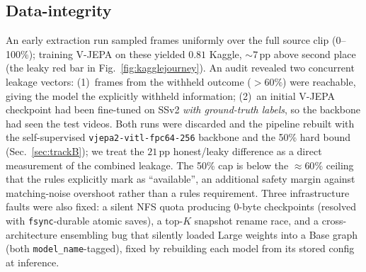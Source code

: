 \documentclass[10pt,twocolumn,letterpaper]{article}
\begin{document}
\subsection{Data-integrity}
\label{sec:integrity}
An early extraction run sampled frames uniformly over the full source clip
(0--100\%); training V-JEPA on these yielded $0.81$ Kaggle, ${\sim}7$\,pp above
second place (the leaky red bar in Fig.~\ref{fig:kagglejourney}). An audit
revealed two concurrent leakage vectors: (1)~frames from the withheld outcome
($>60\%$) were reachable, giving the model the explicitly withheld information;
(2)~an initial V-JEPA checkpoint had been fine-tuned on SSv2 \emph{with
ground-truth labels}, so the backbone had seen the test videos. Both runs were
discarded and the pipeline rebuilt with the self-supervised
\texttt{vjepa2-vitl-fpc64-256} backbone and the 50\% hard bound
(Sec.~\ref{sec:trackB}); we treat the $21$\,pp honest/leaky difference as a
direct measurement of the combined leakage. The 50\% cap is below the
$\approx 60\%$ ceiling that the rules explicitly mark as ``available'', an
additional safety margin against matching-noise overshoot rather than a rules
requirement. Three infrastructure faults were also fixed: a silent NFS quota
producing 0-byte checkpoints (resolved with \texttt{fsync}-durable atomic
saves), a top-$K$ snapshot rename race, and a cross-architecture ensembling bug
that silently loaded Large weights into a Base graph (both
\texttt{model\_name}-tagged), fixed by rebuilding each model from its stored
config at inference.

\end{document}
